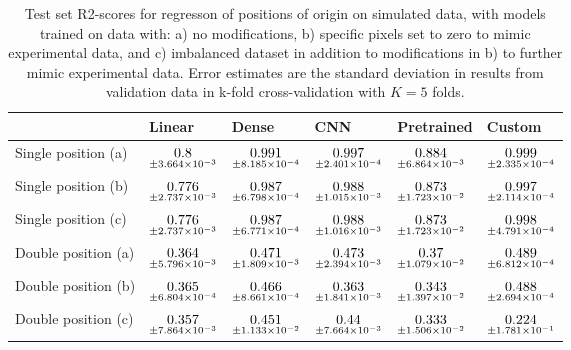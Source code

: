 \begin{table}
\centering
\caption{
Test set R2-scores for regresson of positions of origin on simulated data, with models trained on data with: 
a) no modifications, b) specific pixels set to zero to mimic experimental data, and c) imbalanced dataset
in addition to modifications in b) to further mimic experimental data. Error estimates are the standard deviation 
in results from validation data in k-fold cross-validation with $K=5$ folds.
}
\label{tab:regression-simulated-all-positions-r2}
\begin{tabular}{llllll}
\toprule
{} &                                              Linear &                                               Dense &                                                 CNN &                                          Pretrained &                                              Custom \\
\midrule
Single position (a) &  $\underset{\num{+- 3.664e-03 }  }{\num{ 0.8 } }$ &  $\underset{\num{+- 8.185e-04 }  }{\num{ 0.991 } }$ &  $\underset{\num{+- 2.401e-04 }  }{\num{ 0.997 } }$ &  $\underset{\num{+- 6.864e-03 }  }{\num{ 0.884 } }$ &  $\underset{\num{+- 2.335e-04 }  }{\num{ 0.999 } }$ \\
Single position (b) &  $\underset{\num{+- 2.737e-03 }  }{\num{ 0.776 } }$ &  $\underset{\num{+- 6.798e-04 }  }{\num{ 0.987 } }$ &  $\underset{\num{+- 1.015e-03 }  }{\num{ 0.988 } }$ &  $\underset{\num{+- 1.723e-02 }  }{\num{ 0.873 } }$ &  $\underset{\num{+- 2.114e-04 }  }{\num{ 0.997 } }$ \\
Single position (c) &  $\underset{\num{+- 2.737e-03 }  }{\num{ 0.776 } }$ &  $\underset{\num{+- 6.771e-04 }  }{\num{ 0.987 } }$ &  $\underset{\num{+- 1.016e-03 }  }{\num{ 0.988 } }$ &  $\underset{\num{+- 1.723e-02 }  }{\num{ 0.873 } }$ &  $\underset{\num{+- 4.791e-04 }  }{\num{ 0.998 } }$ \\
Double position (a) &  $\underset{\num{+- 5.796e-03 }  }{\num{ 0.364 } }$ &  $\underset{\num{+- 1.809e-03 }  }{\num{ 0.471 } }$ &  $\underset{\num{+- 2.394e-03 }  }{\num{ 0.473 } }$ &  $\underset{\num{+- 1.079e-02 }  }{\num{ 0.37 } }$ &  $\underset{\num{+- 6.812e-04 }  }{\num{ 0.489 } }$ \\
Double position (b) &  $\underset{\num{+- 6.804e-04 }  }{\num{ 0.365 } }$ &  $\underset{\num{+- 8.661e-04 }  }{\num{ 0.466 } }$ &  $\underset{\num{+- 1.841e-03 }  }{\num{ 0.363 } }$ &  $\underset{\num{+- 1.397e-02 }  }{\num{ 0.343 } }$ &  $\underset{\num{+- 2.694e-04 }  }{\num{ 0.488 } }$ \\
Double position (c) &  $\underset{\num{+- 7.864e-03 }  }{\num{ 0.357 } }$ &  $\underset{\num{+- 1.133e-02 }  }{\num{ 0.451 } }$ &  $\underset{\num{+- 7.664e-03 }  }{\num{ 0.44 } }$ &  $\underset{\num{+- 1.506e-02 }  }{\num{ 0.333 } }$ &  $\underset{\num{+- 1.781e-01 }  }{\num{ 0.224 } }$ \\
\bottomrule
\end{tabular}
\end{table}
